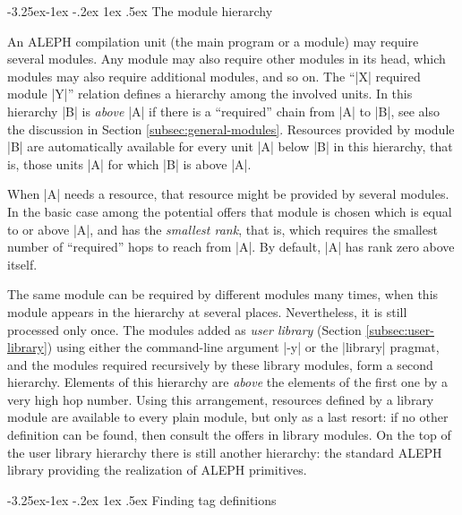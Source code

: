 \documentclass[titlepage]{article}
\makeatletter
\newcommand\A{\textsf{ALEPH}}
\renewcommand\subsection{%
\@startsection{subsection}{2}{\z@}%
   {-3.25ex\@plus -1ex \@minus -.2ex}%
   {1ex \@plus .5ex}%
   {\normalfont\normalsize\bfseries}}
\makeatother
\begin{document}

\subsection{The module hierarchy}\label{subsec:hierarchy}

An \A{} compilation unit (the main program or a module) may require several
modules. Any module may also require other modules in its head, which
modules may also require additional modules, and so on. The ``\pp|X|
required module \pp|Y|'' relation defines a hierarchy among the involved
units. In this hierarchy \pp|B| is \emph{above} \pp|A| if there is a
``required'' chain from \pp|A| to \pp|B|, see also the discussion in Section
\ref{subsec:general-modules}. Resources provided by module \pp|B| are
automatically available for every unit \pp|A| below \pp|B| in
this hierarchy, that is, those units \pp|A| for which \pp|B| is above \pp|A|.

When \pp|A| needs a resource, that resource might be provided by several
modules. In the basic case among the potential offers that module is chosen
which is equal to or above \pp|A|, and has the \emph{smallest rank}, that
is, which requires the smallest number of ``required'' hops to reach from
\pp|A|. By default, \pp|A| has rank zero above itself.

The same module can be required by different modules many times, when this
module appears in the hierarchy at several places. Nevertheless, it is still
processed only once. The modules added as \emph{user library} (Section
\ref{subsec:user-library}) using either the command-line argument \pp|-y| or
the \pp|library| pragmat, and the modules required recursively by these
library modules, form a second hierarchy. Elements of this hierarchy are
\emph{above} the elements of the first one by a very high hop number. Using
this arrangement, resources defined by a library module are available to
every plain module, but only as a last resort: if no other definition can be
found, then consult the offers in library modules. On the top of the user
library hierarchy there is still another hierarchy: the standard \A{}
library providing the realization of \A{} primitives.


\subsection{Finding tag definitions}\label{subsec:qualifier}
\end{document}
